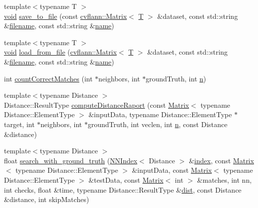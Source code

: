 \begin{DoxyCompactItemize}
\item 
{\footnotesize template$<$typename T $>$ }\\\hyperlink{legacy_8hpp_a8bb47f092d473522721002c86c13b94e}{void} \hyperlink{namespacecvflann_a49deee4b125df3de0b49f5e9e4557fc8}{save\-\_\-to\-\_\-file} (const \hyperlink{classcvflann_1_1Matrix}{cvflann\-::\-Matrix}$<$ \hyperlink{calib3d_8hpp_a3efb9551a871ddd0463079a808916717}{T} $>$ \&dataset, const std\-::string \&\hyperlink{core__c_8h_acc427f35f3bd9f865d39012657cc42f8}{filename}, const std\-::string \&\hyperlink{core__c_8h_add928d8eb85ea33a25a67db3406d4887}{name})
\item 
{\footnotesize template$<$typename T $>$ }\\\hyperlink{legacy_8hpp_a8bb47f092d473522721002c86c13b94e}{void} \hyperlink{namespacecvflann_a753ae84e80c34f48acea4ab64fb7e5da}{load\-\_\-from\-\_\-file} (\hyperlink{classcvflann_1_1Matrix}{cvflann\-::\-Matrix}$<$ \hyperlink{calib3d_8hpp_a3efb9551a871ddd0463079a808916717}{T} $>$ \&dataset, const std\-::string \&\hyperlink{core__c_8h_acc427f35f3bd9f865d39012657cc42f8}{filename}, const std\-::string \&\hyperlink{core__c_8h_add928d8eb85ea33a25a67db3406d4887}{name})
\item 
int \hyperlink{namespacecvflann_acf6c205af1874107b827a6d73fc0d8e4}{count\-Correct\-Matches} (int $\ast$neighbors, int $\ast$ground\-Truth, int \hyperlink{legacy_8hpp_a76f11d9a0a47b94f72c2d0e77fb32240}{n})
\item 
{\footnotesize template$<$typename Distance $>$ }\\Distance\-::\-Result\-Type \hyperlink{namespacecvflann_aa1a11aa8abf2edae2ce1776d7b058c80}{compute\-Distance\-Raport} (const \hyperlink{classcvflann_1_1Matrix}{Matrix}$<$ typename Distance\-::\-Element\-Type $>$ \&input\-Data, typename Distance\-::\-Element\-Type $\ast$target, int $\ast$neighbors, int $\ast$ground\-Truth, int veclen, int \hyperlink{legacy_8hpp_a76f11d9a0a47b94f72c2d0e77fb32240}{n}, const Distance \&distance)
\item 
{\footnotesize template$<$typename Distance $>$ }\\float \hyperlink{namespacecvflann_aff249b1a3cfbd449db4ee469a0cb2a62}{search\-\_\-with\-\_\-ground\-\_\-truth} (\hyperlink{classcvflann_1_1NNIndex}{N\-N\-Index}$<$ Distance $>$ \&\hyperlink{core__c_8h_a750b5d744c39a06bfb13e6eb010e35d0}{index}, const \hyperlink{classcvflann_1_1Matrix}{Matrix}$<$ typename Distance\-::\-Element\-Type $>$ \&input\-Data, const \hyperlink{classcvflann_1_1Matrix}{Matrix}$<$ typename Distance\-::\-Element\-Type $>$ \&test\-Data, const \hyperlink{classcvflann_1_1Matrix}{Matrix}$<$ int $>$ \&matches, int nn, int checks, float \&time, typename Distance\-::\-Result\-Type \&\hyperlink{legacy_8hpp_ae895c2003a87eda49126845b7ac3688e}{dist}, const Distance \&distance, int skip\-Matches)

\end{DoxyCompactItemize}
